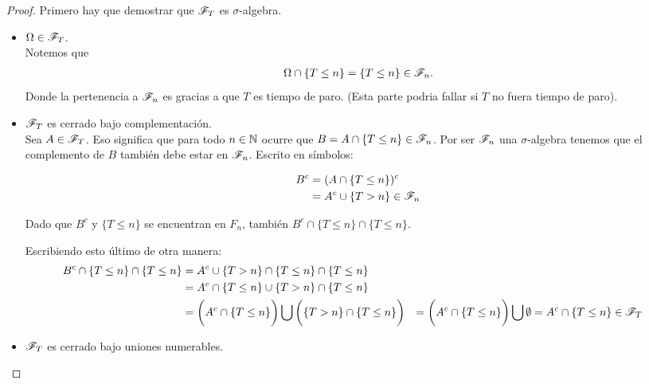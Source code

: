 \begin{proof}
		Primero hay que demostrar que $\mathscr{F}_T$ es $\sigma$-algebra.\\
		
		\begin{itemize}
			\item $\Omega \in \mathscr{F}_T$. \\
			
				Notemos que 
				\begin{align}
					\Omega \cap \{T \leq n\} = \{T \leq n\} \in \mathscr{F}_n.
				\end{align}
				Donde la pertenencia a $\mathscr{F}_n$ es gracias a que $T$ es tiempo de paro. (Esta parte podria fallar si $T$ no fuera tiempo de paro).\\
			
			\item $\mathscr{F}_T$ es cerrado bajo complementación.\\
			
				Sea $A \in \mathscr{F}_T$. Eso significa que para todo $n \in  \mathbb{N}$ ocurre que $B = A \cap \{ T \leq n \} \in \mathscr{F}_n$. Por ser $\mathscr{F}_n$
								una $\sigma$-algebra tenemos que el complemento de $B$ también debe estar en $\mathscr{F}_n$. Escrito en símbolos:
				
				\begin{align}
					B^c 	&= (A   \cap \{ T \leq n \})^c \\
							&=  A^c \cup \{ T > n \} \in \mathscr{F}_n
				\end{align}
				
				Dado que $B^c$ y $\{ T \leq n \}$ se encuentran en $F_n$, también $B^c \cap \{ T \leq n \} \cap \{ T \leq n \}$.
				
				Escribiendo esto último de otra manera:
				\begin{align}
					B^c \cap \{ T \leq n \} \cap \{ T \leq n \} 	&=		A^c \cup \{ T > n \} \cap \{ T \leq n \} \cap \{ T \leq n \} \\
																	&= 		A^c \cap \{ T \leq n \} \cup \{ T > n \} \cap \{ T \leq n \} \\
																	&= 		\bigg(A^c \cap \{ T \leq n \}\bigg) 
																				\bigcup 
																			\bigg(\{ T > n \} \cap \{ T \leq n \}\bigg)
																	&=		\bigg(A^c \cap \{ T \leq n \}\bigg)	\bigcup \emptyset
																	&=		A^c \cap \{ T \leq n \} \in \mathscr{F}_T
				\end{align}
				
				
			\item $\mathscr{F}_T$ es cerrado bajo uniones numerables.
		\end{itemize}
		

\end{proof}
